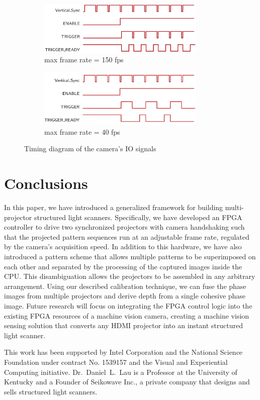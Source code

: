 \documentclass[]{spie}  %
\begin{document}
\begin{figure}
\centering
\begin{subfigure}{.5\textwidth}
  \centering
  \includegraphics[width=8cm]{phase2.png}
  \caption{max frame rate = 150 fps}
  \label{fig:sub3}
\end{subfigure}%
\begin{subfigure}{.5\textwidth}
  \centering
   \includegraphics[width=8cm]{gpio.png}
  \caption{max frame rate = 40 fps}
  \label{fig:sub4}
\end{subfigure}
\caption{Timing diagram of the camera's IO signals}
\label{Fig:7}
\end{figure}


\section{Conclusions}
In this paper, we have introduced a generalized framework for building multi-projector structured light scanners. Specifically, we have developed an FPGA controller to drive two synchronized projectors with camera handshaking such that the projected pattern sequences run at an adjustable frame rate, regulated by the camera's acquisition speed.  In addition to this hardware, we have also introduced a pattern scheme that allows multiple patterns to be superimposed on each other and separated by the processing of the captured images inside the CPU.  This disambiguation allows the projectors to be assembled in any arbitrary arrangement. Using our described calibration technique, we can fuse the phase images from multiple projectors  and derive depth from a single cohesive phase image. Future research will focus on integrating the FPGA control logic into the existing FPGA resources of a machine vision camera, creating a machine vision sensing solution that converts any HDMI projector into an instant structured light scanner.

\acknowledgments
This work has been supported by Intel Corporation and the National Science Foundation under contract No. 1539157 and the Visual and Experiential Computing initiative. Dr.~Daniel~L.~Lau is a Professor at the University of Kentucky and a Founder of Seikowave Inc., a private company that designs and sells structured light scanners.

\end{document}
